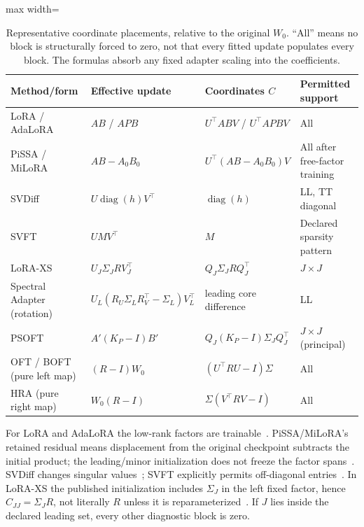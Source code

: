 \documentclass{article}
\newcommand{\diag}{\operatorname{diag}}
\begin{document}
\begin{table}[t]
\centering
\caption{Representative coordinate placements, relative to the original $W_0$. ``All'' means no block is structurally forced to zero, not that every fitted update populates every block. The formulas absorb any fixed adapter scaling into the coefficients.}
\label{tab:methodcoordinates}
\begin{adjustbox}{max width=\linewidth}
\begin{tabular}{llll}
\toprule
Method/form & Effective update & Coordinates $C$ & Permitted support\\
\midrule
LoRA / AdaLoRA & $AB$ / $APB$ & $U^\top ABV$ / $U^\top APBV$ & All\\
PiSSA / MiLoRA & $AB-A_0B_0$ & $U^\top(AB-A_0B_0)V$ & All after free-factor training\\
SVDiff & $U\diag(h)V^\top$ & $\diag(h)$ & LL, TT diagonal\\
SVFT & $UMV^\top$ & $M$ & Declared sparsity pattern\\
LoRA-XS & $U_J\Sigma_JRV_J^\top$ & $Q_J\Sigma_JRQ_J^\top$ & $J\times J$\\
Spectral Adapter (rotation) & $U_L(R_U\Sigma_LR_V^\top-\Sigma_L)V_L^\top$ & leading core difference & LL\\
PSOFT & $A'(K_P-I)B'$ & $Q_J(K_P-I)\Sigma_JQ_J^\top$ & $J\times J$ (principal)\\
OFT / BOFT (pure left map) & $(R-I)W_0$ & $(U^\top RU-I)\Sigma$ & All\\
HRA (pure right map) & $W_0(R-I)$ & $\Sigma(V^\top RV-I)$ & All\\
\bottomrule
\end{tabular}
\end{adjustbox}
\end{table}

For LoRA and AdaLoRA the low-rank factors are trainable~\citep{hu2022lora,zhang2023adalora}. PiSSA/MiLoRA's retained residual means displacement from the original checkpoint subtracts the initial product; the leading/minor initialization does not freeze the factor spans~\citep{meng2024pissa,wang2025milora}. SVDiff changes singular values~\citep{han2023svdiff}; SVFT explicitly permits off-diagonal entries~\citep{lingam2024svft}. In LoRA-XS the published initialization includes $\Sigma_J$ in the left fixed factor, hence $C_{JJ}=\Sigma_JR$, not literally $R$ unless it is reparameterized~\citep{balazy2024lora}. If $J$ lies inside the declared leading set, every other diagnostic block is zero.
\end{document}
